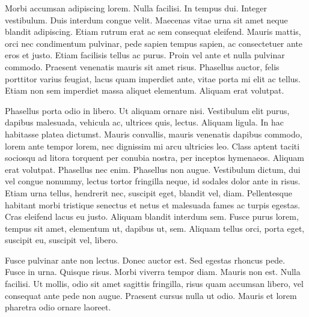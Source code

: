 \documentclass[12pt,twoside,letterpaper]{article}
\begin{document}
Morbi accumsan adipiscing lorem. Nulla facilisi. In tempus dui. Integer vestibulum. Duis interdum congue velit. Maecenas vitae urna sit amet neque blandit adipiscing. Etiam rutrum erat ac sem consequat eleifend. Mauris mattis, orci nec condimentum pulvinar, pede sapien tempus sapien, ac consectetuer ante eros et justo. Etiam facilisis tellus ac purus. Proin vel ante et nulla pulvinar commodo. Praesent venenatis mauris sit amet risus. Phasellus auctor, felis porttitor varius feugiat, lacus quam imperdiet ante, vitae porta mi elit ac tellus. Etiam non sem imperdiet massa aliquet elementum. Aliquam erat volutpat.

Phasellus porta odio in libero. Ut aliquam ornare nisi. Vestibulum elit purus, dapibus malesuada, vehicula ac, ultrices quis, lectus. Aliquam ligula. In hac habitasse platea dictumst. Mauris convallis, mauris venenatis dapibus commodo, lorem ante tempor lorem, nec dignissim mi arcu ultricies leo. Class aptent taciti sociosqu ad litora torquent per conubia nostra, per inceptos hymenaeos. Aliquam erat volutpat. Phasellus nec enim. Phasellus non augue. Vestibulum dictum, dui vel congue nonummy, lectus tortor fringilla neque, id sodales dolor ante in risus. Etiam urna tellus, hendrerit nec, suscipit eget, blandit vel, diam. Pellentesque habitant morbi tristique senectus et netus et malesuada fames ac turpis egestas. Cras eleifend lacus eu justo. Aliquam blandit interdum sem. Fusce purus lorem, tempus sit amet, elementum ut, dapibus ut, sem. Aliquam tellus orci, porta eget, suscipit eu, suscipit vel, libero.

Fusce pulvinar ante non lectus. Donec auctor est. Sed egestas rhoncus pede. Fusce in urna. Quisque risus. Morbi viverra tempor diam. Mauris non est. Nulla facilisi. Ut mollis, odio sit amet sagittis fringilla, risus quam accumsan libero, vel consequat ante pede non augue. Praesent cursus nulla ut odio. Mauris et lorem pharetra odio ornare laoreet.
\end{document}
